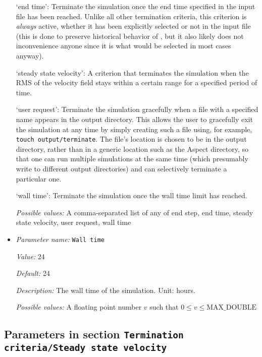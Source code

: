 \begin{itemize}
`end time': Terminate the simulation once the end time specified in the input file has been reached. Unlike all other termination criteria, this criterion is \textit{always} active, whether it has been explicitly selected or not in the input file (this is done to preserve historical behavior of \aspect{}, but it also likely does not inconvenience anyone since it is what would be selected in most cases anyway).

`steady state velocity': A criterion that terminates the simulation when the RMS of the velocity field stays within a certain range for a specified period of time.

`user request': Terminate the simulation gracefully when a file with a specified name appears in the output directory. This allows the user to gracefully exit the simulation at any time by simply creating such a file using, for example, \texttt{touch output/terminate}. The file's location is chosen to be in the output directory, rather than in a generic location such as the Aspect directory, so that one can run multiple simulations at the same time (which presumably write to different output directories) and can selectively terminate a particular one.

`wall time': Terminate the simulation once the wall time limit has reached.


{\it Possible values:} A comma-separated list of any of end step, end time, steady state velocity, user request, wall time
\item {\it Parameter name:} {\tt Wall time}
\label{parameters:Termination criteria/Wall time}
\label{parameters:Termination_20criteria/Wall_20time}


{\it Value:} 24


{\it Default:} 24


{\it Description:} The wall time of the simulation. Unit: hours.


{\it Possible values:} A floating point number $v$ such that $0 \leq v \leq \text{MAX\_DOUBLE}$
\end{itemize}



\subsection{Parameters in section \tt Termination criteria/Steady state velocity}
\label{parameters:Termination_20criteria/Steady_20state_20velocity}

